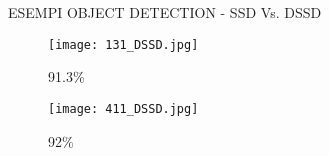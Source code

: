 \begin{frame}{ESEMPI OBJECT DETECTION - SSD Vs. DSSD}
\begin{minipage}{\linewidth}
\begin{minipage}{0.32\linewidth}
        \end{minipage}
        \hspace{0.35cm}
        \begin{minipage}{0.32\linewidth}
            \begin{figure}
                \centering
                \texttt{[image: 131\_DSSD.jpg]}
                \caption{91.3\%}
            \end{figure}
        \end{minipage}
        \hspace{-0.50cm}
        \begin{minipage}{0.32\linewidth}
            \begin{figure}
                \centering
                \texttt{[image: 411\_DSSD.jpg]}  
                \caption{92\%}
            \end{figure}
        \end{minipage}
    \end{minipage}   
\end{frame}
